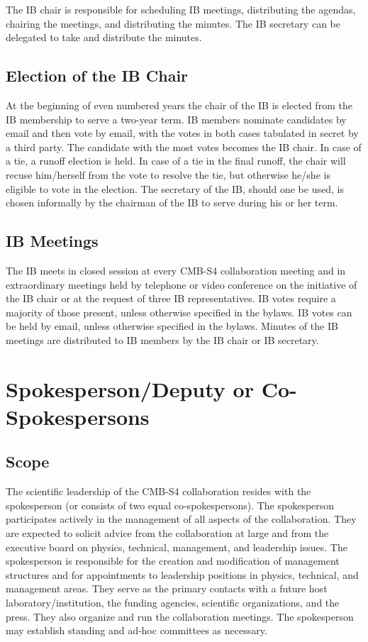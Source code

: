 \documentclass[12pt]{article}
\begin{document}
The IB chair is responsible for scheduling IB meetings, distributing the agendas, chairing the meetings, and distributing the minutes. The IB secretary can be delegated to take and distribute the minutes.

\subsection{Election of the IB Chair}

At the beginning of even numbered years the chair of the IB is elected from the IB membership to serve a two-year term. IB members nominate candidates by email and then vote by email, with the votes in both cases tabulated in secret by a third party. The candidate with the most votes becomes the IB chair. In case of a tie, a runoff election is held. In case of a tie in the final runoff, the chair will recuse him/herself from the vote to resolve the tie, but otherwise he/she is eligible to vote in the election. The secretary of the IB, should one be used, is chosen informally by the chairman of the IB to serve during his or her term.

\subsection{IB Meetings}

The IB meets in closed session at every CMB-S4 collaboration meeting and in extraordinary meetings held by telephone or video conference on the initiative of the IB chair or at the request of three IB representatives. IB votes require a majority of those present, unless otherwise specified in the bylaws. IB votes can be held by email, unless otherwise specified in the bylaws. Minutes of the IB meetings are distributed to IB members by the IB chair or IB secretary.

\section{Spokesperson/Deputy or Co-Spokespersons}
\label{sec:spokes}

\subsection{Scope}

The	scientific	leadership	of	the	CMB-S4	collaboration	resides	with the	spokesperson	(or	consists	of	two	
equal	co-spokespersons).			The	spokesperson	participates	actively	in	the	management	of	all	aspects	of	
the	collaboration.	They	are	expected	to	solicit	advice	from	the	collaboration	at	large	and	from	the	
executive	board	on	physics,	technical,	management,	and	leadership	issues.	The	spokesperson	is
responsible	for	the	creation	and	modification	of	management	structures	and	for	appointments	to	
leadership	positions	in	physics,	technical,	and	management	areas.	They	serve	as	the	primary	contacts	
with	a	future	host	laboratory/institution,	the	funding	agencies,	scientific	organizations,	and	the	press.
They	also	organize	and	run	the	collaboration	meetings.	The	spokesperson	may	establish	standing	and	
ad-hoc	committees	as	necessary.
\end{document}

